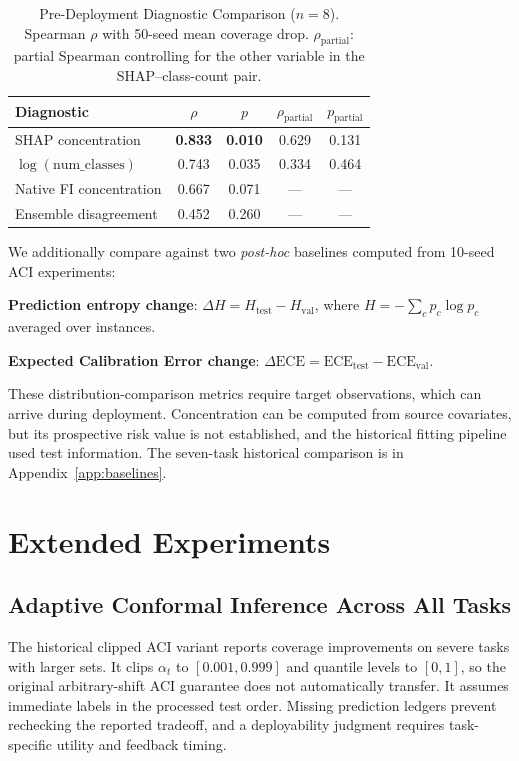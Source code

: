 \documentclass[accepted]{uai2026} %
\begin{document}
\begin{table}[t]
\centering
\caption{Pre-Deployment Diagnostic Comparison ($n=8$). Spearman $\rho$ with 50-seed mean coverage drop. $\rho_{\text{partial}}$: partial Spearman controlling for the other variable in the SHAP--class-count pair.}\label{tab:diagnostic_comparison}
\small
\begin{tabular}{@{}lcccc@{}}
\toprule
Diagnostic & $\rho$ & $p$ & $\rho_{\text{partial}}$ & $p_{\text{partial}}$ \\
\midrule
SHAP concentration & \textbf{0.833} & \textbf{0.010} & 0.629 & 0.131 \\
$\log(\text{num\_classes})$ & 0.743 & 0.035 & 0.334 & 0.464 \\
Native FI concentration & 0.667 & 0.071 & --- & --- \\
Ensemble disagreement & 0.452 & 0.260 & --- & --- \\
\bottomrule
\end{tabular}
\end{table}

We additionally compare against two \textit{post-hoc} baselines computed from 10-seed ACI experiments:

\textbf{Prediction entropy change}: $\Delta H = H_{\text{test}} - H_{\text{val}}$, where $H = -\sum_c p_c \log p_c$ averaged over instances.

\textbf{Expected Calibration Error change}: \mbox{$\Delta \text{ECE} = \text{ECE}_{\text{test}} - \text{ECE}_{\text{val}}$}.

These distribution-comparison metrics require target observations, which can arrive during deployment. Concentration can be computed from source covariates, but its prospective risk value is not established, and the historical fitting pipeline used test information. The seven-task historical comparison is in Appendix~\ref{app:baselines}.

\section{Extended Experiments}\label{sec:extended}

\subsection{Adaptive Conformal Inference Across All Tasks}

The historical clipped ACI variant reports coverage improvements on severe tasks with larger sets. It clips $\alpha_t$ to $[0.001,0.999]$ and quantile levels to $[0,1]$, so the original arbitrary-shift ACI guarantee does not automatically transfer. It assumes immediate labels in the processed test order. Missing prediction ledgers prevent rechecking the reported tradeoff, and a deployability judgment requires task-specific utility and feedback timing.
\end{document}
